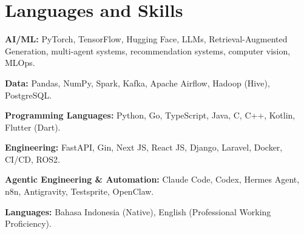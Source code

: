 \section{Languages and Skills}
\begin{cvskills}
  \item \textbf{AI/ML:} PyTorch, TensorFlow, Hugging Face, LLMs, Retrieval-Augmented Generation, multi-agent systems, recommendation systems, computer vision, MLOps.
  \item \textbf{Data:} Pandas, NumPy, Spark, Kafka, Apache Airflow, Hadoop (Hive), PostgreSQL.
  \item \textbf{Programming Languages:} Python, Go, TypeScript, Java, C, C++, Kotlin, Flutter (Dart).
  \item \textbf{Engineering:} FastAPI, Gin, Next JS, React JS, Django, Laravel, Docker, CI/CD, ROS2.
  \item \textbf{Agentic Engineering \& Automation:} Claude Code, Codex, Hermes Agent, n8n, Antigravity, Testsprite, OpenClaw.
  \item \textbf{Languages:} Bahasa Indonesia (Native), English (Professional Working Proficiency).
\end{cvskills}
